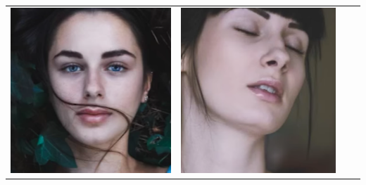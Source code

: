 \begin{table}[H]
\begin{tabular}{|N||c|c|c|}
\begin{minipage}{.29\textwidth}
    \includegraphics[width=\textwidth,height=\textheight,keepaspectratio]{images/match_other_1_targ}
  \end{minipage} & 
  \begin{minipage}{.29\textwidth}
    \includegraphics[width=\textwidth,height=\textheight,keepaspectratio]{images/match_other_1_res}

\end{minipage}
\end{tabular}
\end{table}

